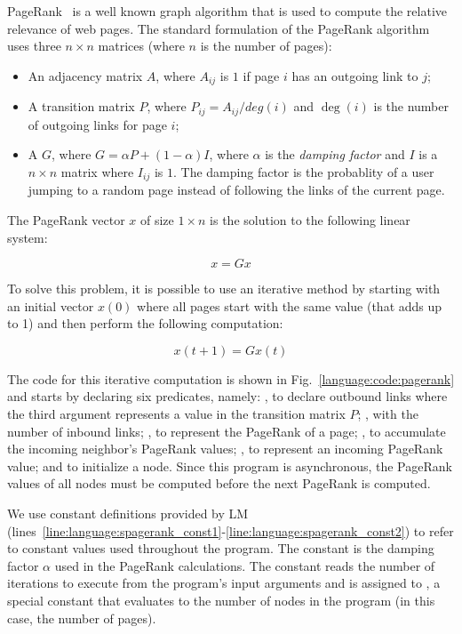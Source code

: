 PageRank~\cite{Page:2001:MNR} is a well known graph algorithm that is used to
compute the relative relevance of web pages. The standard formulation of the
PageRank algorithm uses three $n \times n$ matrices (where $n$ is the number of
pages):

\begin{itemize}

   \item An adjacency matrix $A$, where $A_{ij}$ is $1$ if page $i$ has an
      outgoing link to $j$;

   \item A transition matrix $P$, where $P_{ij} = A_{ij}/deg(i)$ and $\deg(i)$
      is the number of outgoing links for page $i$;

   \item A  $G$, where $G = \alpha P + (1-\alpha)I$, where
      $\alpha$ is the \emph{damping factor} and $I$ is a $n \times n$ matrix
      where $I_{ij}$ is $1$. The damping factor is the probablity of a user
      jumping to a random page instead of following the links of the current
      page.

\end{itemize}

The PageRank vector $x$ of size $1 \times n$ is the solution to the following
linear system:

\[
   x = G x
\]

To solve this problem, it is possible to use an iterative method by starting
with an initial vector $x(0)$ where all pages start with the same value (that
adds up to 1) and then perform the following computation:

\[
   x(t + 1) = G x(t)
\]

The code for this iterative computation is shown in
Fig.~\ref{language:code:pagerank} and starts by declaring six predicates,
namely: , to declare outbound links where the third argument
represents a value in the transition matrix $P$; , with the
number of inbound links; , to represent the PageRank of a page;
, to accumulate the incoming neighbor's PageRank values;
, to represent an incoming PageRank value; and
 to initialize a node.  Since this program is asynchronous, the
PageRank values of all nodes must be computed before the next PageRank is
computed.

We use constant definitions provided by LM
(lines~\ref{line:language:spagerank_const1}-\ref{line:language:spagerank_const2})
to refer to constant values used throughout the program. The 
constant is the damping factor $\alpha$ used in the PageRank calculations. The
constant  reads the number of iterations to execute from the
program's input arguments and  is assigned to , a
special constant that evaluates to the number of nodes in the program (in this
case, the number of pages).

